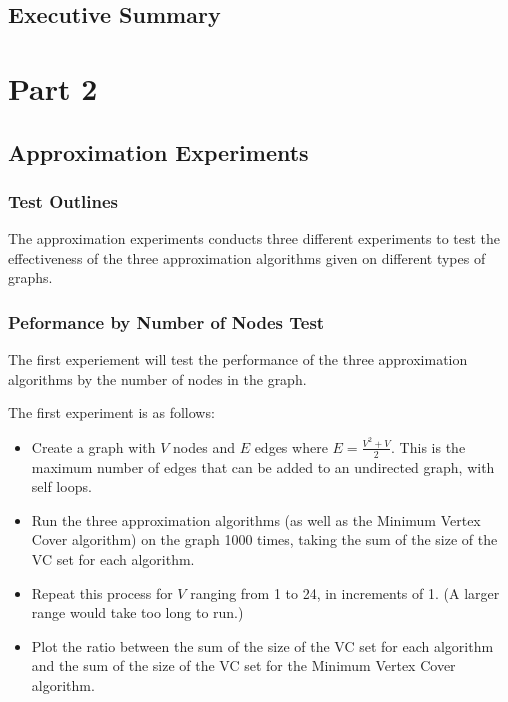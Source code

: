 \documentclass[12pt]{article}
\begin{document}
\subsection{Executive Summary}


%
%
%
%
\newpage
\section{Part 2}
\subsection{Approximation Experiments}

\subsubsection{Test Outlines}

The approximation experiments conducts three different experiments to test the effectiveness of the three approximation algorithms given on different types of graphs.

\subsubsection{Peformance by Number of Nodes Test}

The first experiement will test the performance of the three approximation algorithms by the number of nodes in the graph.

The first experiment is as follows: 

\begin{itemize}
    \item Create a graph with $V$ nodes and $E$ edges where $E = \frac{V^2 + V}{2}$. This is the maximum number of edges that can be added to an undirected graph, with self loops.
    \item Run the three approximation algorithms (as well as the Minimum Vertex Cover algorithm) on the graph 1000 times, taking the sum of the size of the VC set for each algorithm.
    \item Repeat this process for $V$ ranging from 1 to 24, in increments of 1. (A larger range would take too long to run.)
    \item Plot the ratio between the sum of the size of the VC set for each algorithm and the sum of the size of the VC set for the Minimum Vertex Cover algorithm.
\end{itemize}
\newpage
\end{document}
